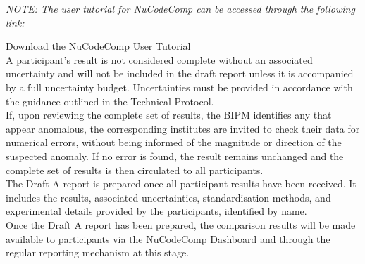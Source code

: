 \documentclass[12pt]{iopart}
\renewcommand{\note}[1]{%
    \noindent\textit{ #1}
}
\begin{document}
\note{\small{NOTE: The user tutorial for NuCodeComp can be accessed through the following link:}}
\href{run:./NuCodeComp_UserTutorial.pdf}{\small{Download the NuCodeComp User Tutorial}} \\

A participant’s result is not considered complete without an associated uncertainty and will not be included in the draft report unless it is accompanied by a full uncertainty budget. Uncertainties must be provided in accordance with the guidance outlined in the Technical Protocol. \\

If, upon reviewing the complete set of results, the BIPM identifies any that appear anomalous, the corresponding institutes are invited to check their data for numerical errors, without being informed of the magnitude or direction of the suspected anomaly. If no error is found, the result remains unchanged and the complete set of results is then circulated to all participants. \\

The Draft A report is prepared once all participant results have been received. It includes the results, associated uncertainties, standardisation methods, and experimental details provided by the participants, identified by name. \\

Once the Draft A report has been prepared, the comparison results will be made available to participants via the NuCodeComp Dashboard and through the regular reporting mechanism at this stage. \\

\clearpage

\end{document}
